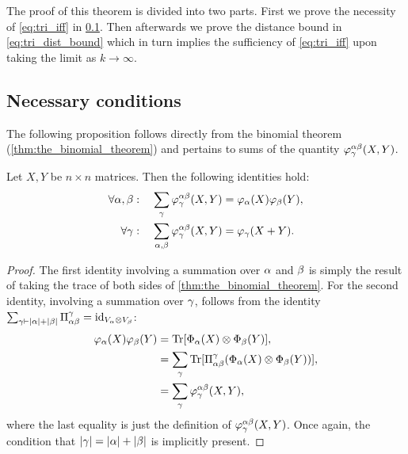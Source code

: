 \documentclass[notitlepage, 11pt, letterpaper]{amsart}
\begin{document}
The proof of this theorem is divided into two parts.
First we prove the necessity of \cref{eq:tri_iff} in \cref{sec:tri_necess}.
Then afterwards we prove the distance bound in \cref{eq:tri_dist_bound} which in turn implies the sufficiency of \cref{eq:tri_iff} upon taking the limit as $k \to \infty$.

\subsection{Necessary conditions}
\label{sec:tri_necess}

The following proposition follows directly from the binomial theorem (\cref{thm:the_binomial_theorem}) and pertains to sums of the quantity $\varphi^{\alpha\beta}_{\gamma}(X,Y)$.

\begin{prop}
    \label{prop:bisummation}
    Let $X,Y$ be $n\times n$ matrices. Then the following identities hold:
    \begin{align}
        \forall \alpha,\beta : \quad \sum_{\gamma} \varphi^{\alpha\beta}_{\gamma}(X,Y) &= \varphi_{\alpha}(X)\varphi_{\beta}(Y), \\
        \forall \gamma : \quad \sum_{\alpha,\beta} \varphi^{\alpha\beta}_{\gamma}(X,Y) &= \varphi_{\gamma}(X+Y).
    \end{align}
\end{prop}
\begin{proof}
    The first identity involving a summation over $\alpha$ and $\beta$ is simply the result of taking the trace of both sides of \cref{thm:the_binomial_theorem}.
    For the second identity, involving a summation over $\gamma$, follows from the identity $\sum_{\gamma \vdash |\alpha|+|\beta|} \Pi^{\gamma}_{\alpha\beta} = \operatorname{id}_{V_{\alpha}\otimes V_{\beta}}$:
    \begin{align}
        \begin{split}
            \varphi_{\alpha}(X)\varphi_{\beta}(Y)
            &= \operatorname{Tr}[\Phi_{\alpha}(X) \otimes \Phi_{\beta}(Y)], \\
            &= \sum_{\gamma} \operatorname{Tr}[\Pi^{\gamma}_{\alpha\beta}(\Phi_{\alpha}(X) \otimes \Phi_{\beta}(Y))], \\
            &= \sum_{\gamma} \varphi^{\alpha\beta}_{\gamma}(X,Y),
        \end{split}
    \end{align}
    where the last equality is just the definition of $\varphi^{\alpha\beta}_{\gamma}(X,Y)$.
    Once again, the condition that $|\gamma| = |\alpha| + |\beta|$ is implicitly present.
\end{proof}
\end{document}
